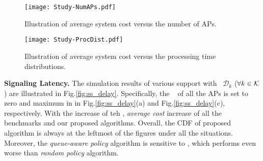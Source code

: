 \begin{figure}[hbt]                                                 %
    \centering                                                      %
    \texttt{[image: Study-NumAPs.pdf]}        %
    \caption{Illustration of average system cost versus the number of APs.}
    \label{fig:ss_scale}                                            %
\end{figure}                                                        %

\begin{figure}[hbt]                                                 %
    \centering                                                      %
    \texttt{[image: Study-ProcDist.pdf]}      %
    \caption{Illustration of average system cost versus the processing time distributions.}
    \label{fig:ss_dist}                                             %
\end{figure}                                                        %


\textbf{Signaling Latency.}
The simulation results of various support with \brlatency~$\mathcal{D}_{k}$ ($\forall k\in\mathcal{K}$) are illustrated in Fig.\ref{fig:ss_delay}.
Specifically, the \brlatency~ of all the APs is set to zero and maximum in in Fig.\ref{fig:ss_delay}(a) and Fig.\ref{fig:ss_delay}(c), respectively.
With the increase of teh \brlatency, \emph{average cost} increase of all the benchmarks and our proposed algorithms.
Overall, the CDF of proposed algorithm is always at the leftmost of the figures under all the situations.
Moreover, the \emph{queue-aware policy} algorithm is sensitive to \brlatency, which performs even  worse than \emph{random policy} algorithm.

